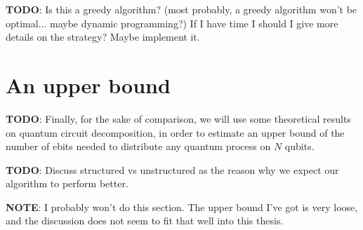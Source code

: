 \textbf{TODO}: Is this a greedy algorithm? (most probably, a greedy algorithm won't be optimal... maybe dynamic programming?) If I have time I should I give more details on the strategy? Maybe implement it.

\section{An upper bound}

\textbf{TODO}: Finally, for the sake of comparison, we will use some theoretical results on quantum circuit decomposition, in order to estimate an upper bound of the number of ebits needed to distribute any quantum process on \(N\) qubits.

\textbf{TODO}: Discuss structured vs unstructured as the reason why we expect our algorithm to perform better.

\textbf{NOTE}: I probably won't do this section. The upper bound I've got is very loose, and the discussion does not seem to fit that well into this thesis.